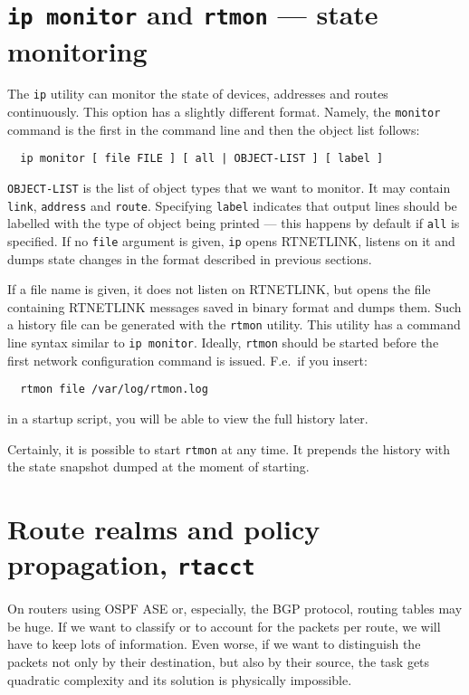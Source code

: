 \section{{\tt ip monitor} and {\tt rtmon} --- state monitoring}
\label{IP-MONITOR}

The \verb|ip| utility can monitor the state of devices, addresses
and routes continuously. This option has a slightly different format.
Namely,
the \verb|monitor| command is the first in the command line and then
the object list follows:
\begin{verbatim}
  ip monitor [ file FILE ] [ all | OBJECT-LIST ] [ label ]
\end{verbatim}
\verb|OBJECT-LIST| is the list of object types that we want to
monitor.  It may contain \verb|link|, \verb|address| and \verb|route|.
Specifying \verb|label| indicates that output lines should be labelled
with the type of object being printed --- this happens by default if
\verb|all| is specified.  If no \verb|file| argument is given,
\verb|ip| opens RTNETLINK, listens on it and dumps state changes in
the format described in previous sections.

If a file name is given, it does not listen on RTNETLINK,
but opens the file containing RTNETLINK messages saved in binary format
and dumps them. Such a history file can be generated with the
\verb|rtmon| utility. This utility has a command line syntax similar to
\verb|ip monitor|.
Ideally, \verb|rtmon| should be started before
the first network configuration command is issued. F.e.\ if
you insert:
\begin{verbatim}
  rtmon file /var/log/rtmon.log
\end{verbatim}
in a startup script, you will be able to view the full history
later.

Certainly, it is possible to start \verb|rtmon| at any time.
It prepends the history with the state snapshot dumped at the moment
of starting.


\section{Route realms and policy propagation, {\tt rtacct}}
\label{RT-REALMS}

On routers using OSPF ASE or, especially, the BGP protocol, routing
tables may be huge. If we want to classify or to account for the packets
per route, we will have to keep lots of information. Even worse, if we
want to distinguish the packets not only by their destination, but
also by their source, the task gets quadratic complexity and its solution
is physically impossible.

